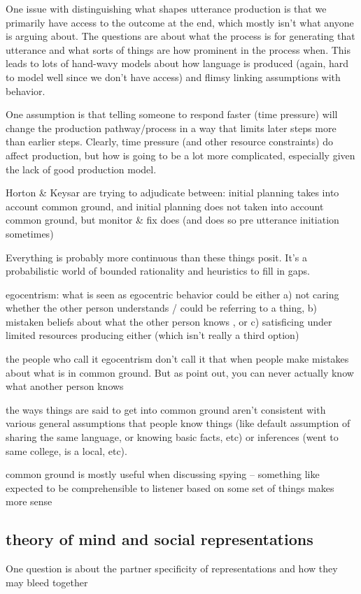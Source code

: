 \documentclass[]{article}
\begin{document}
One issue with distinguishing what shapes utterance production is that we primarily have access to the outcome at the end, which mostly isn't what anyone is arguing about. The questions are about what the process is for generating that utterance and what sorts of things are how prominent in the process when. This leads to lots of hand-wavy models about how language is produced (again, hard to model well since we don't have access) and flimsy linking assumptions with behavior. 

One assumption is that telling someone to respond faster (time pressure) will change the production pathway/process in a way that limits later steps more than earlier steps. Clearly, time pressure (and other resource constraints) do affect production, but how is going to be a lot more complicated, especially given the lack of good production model. 

Horton \& Keysar are trying to adjudicate between: initial planning takes into account common ground, and initial planning does not taken into account common ground, but monitor \& fix does (and does so pre utterance initiation sometimes) 

Everything is probably more continuous than these things posit. It's a probabilistic world of bounded rationality and heuristics to fill in gaps. 

egocentrism: what is seen as egocentric behavior could be either a) not caring whether the other person understands / could be referring to a thing, b) mistaken beliefs about what the other person knows , or c) satisficing under limited resources producing either (which isn't really a third option) 

the people who call it egocentrism don't call it that when people make mistakes about what is in common ground. But as \cite{hanna2003} point out, you can never actually know what another person knows 

the ways things are said to get into common ground aren't consistent with various general assumptions that people know things (like default assumption of sharing the same language, or knowing basic facts, etc) or inferences (went to same college, is a local, etc). 

common ground is mostly useful when discussing spying -- something like expected to be comprehensible to listener based on some set of things makes more sense 

\subsection{theory of mind and social representations}
One question is about the partner specificity of representations and how they may bleed together
\end{document}
